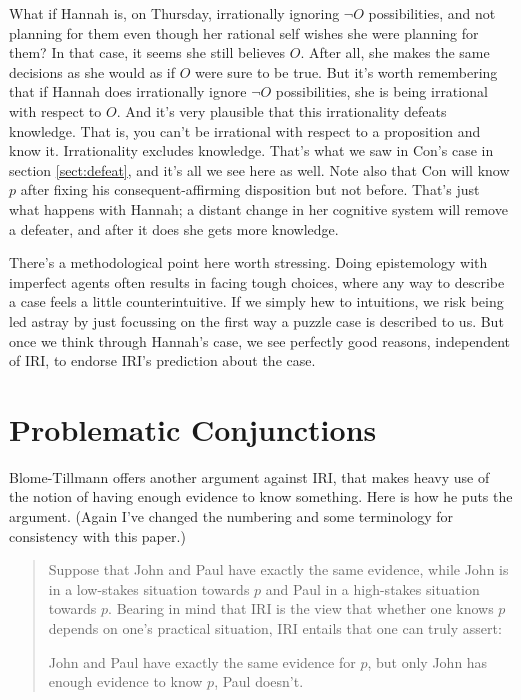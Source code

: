 \documentclass[oneside]{book}
\renewcommand{\numbex}[2]{
\begin{enumerate*}
\setcounter{enumi}{\value{paper}}
\renewcommand{\labelenumi}{(\arabic{enumi})}
#2
\end{enumerate*}
\addtocounter{paper}{#1}}
\begin{document}
What if Hannah is, on Thursday, irrationally ignoring $\neg O$ possibilities, and not planning for them even though her rational self wishes she were planning for them? In that case, it seems she still believes $O$. After all, she makes the same decisions as she would as if $O$ were sure to be true. But it's worth remembering that if Hannah does irrationally ignore $\neg O$ possibilities, she is being irrational with respect to $O$. And it's very plausible that this irrationality defeats knowledge. That is, you can't be irrational with respect to a proposition and know it. Irrationality excludes knowledge. That's what we saw in Con's case in section \ref{sect:defeat}, and it's all we see here as well. Note also that Con will know $p$ after fixing his consequent-affirming disposition but not before. That's just what happens with Hannah; a distant change in her cognitive system will remove a defeater, and after it does she gets more knowledge.

There's a methodological point here worth stressing. Doing epistemology with imperfect agents often results in facing tough choices, where any way to describe a case feels a little counterintuitive. If we simply hew to intuitions, we risk being led astray by just focussing on the first way a puzzle case is described to us. But once we think through Hannah's case, we see perfectly good reasons, independent of IRI, to endorse IRI's prediction about the case.

\section{Problematic Conjunctions} \label{sect:conj}
Blome-Tillmann offers another argument against IRI, that makes heavy use of the notion of having enough evidence to know something. Here is how he puts the argument. (Again I've changed the numbering and some terminology for consistency with this paper.)

\begin{quote}
\noindent Suppose that John and Paul have exactly the same evidence, while John is in a low-stakes situation towards $p$ and Paul in a high-stakes situation towards $p$. Bearing in mind that IRI is the view that whether one knows $p$ depends on one's practical situation, IRI entails that one can truly assert:

\numbex{1}{
\item \label{SameEv} John and Paul have exactly the same evidence for $p$, but only John has enough evidence to know $p$, Paul doesn't.} \cite[328-9]{MBT2009}
\end{quote}
\end{document}
